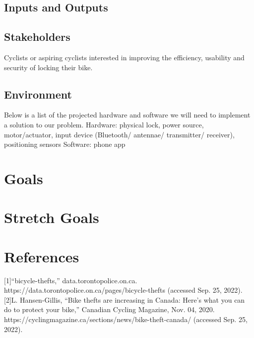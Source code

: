 \documentclass{article}
\begin{document}
\subsection{Inputs and Outputs}


\subsection{Stakeholders}

Cyclists or aspiring cyclists interested in improving the efficiency, usability and security of locking their bike.

\subsection{Environment}

Below is a list of the projected hardware and software we will need to implement a solution to our problem.
Hardware: physical lock, power source, motor/actuator, input device (Bluetooth/ antennae/ transmitter/ receiver), positioning sensors 
Software: phone app


\section{Goals}


\section{Stretch Goals}

\section{References}

[1]“bicycle-thefts,” data.torontopolice.on.ca. https://data.torontopolice.on.ca/pages/bicycle-thefts (accessed Sep. 25, 2022).
[2]L. Hansen-Gillis, “Bike thefts are increasing in Canada: Here’s what you can do to protect your bike,” Canadian Cycling Magazine, Nov. 04, 2020. https://cyclingmagazine.ca/sections/news/bike-theft-canada/ (accessed Sep. 25, 2022).
‌
‌
\end{document}
